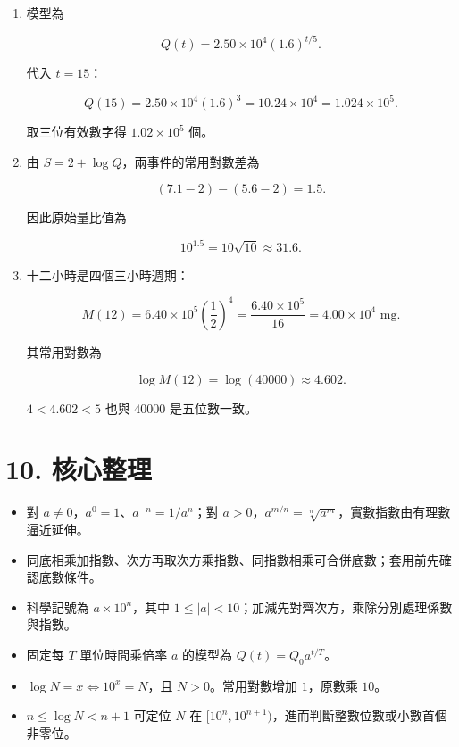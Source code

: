 \documentclass[11pt,a4paper]{article}
\providecommand{\tightlist}{%
  \setlength{\itemsep}{0pt}\setlength{\parskip}{0pt}}
\begin{document}
\begin{enumerate}
  \[
  2^{120}=10^{120\log2}\approx10^{36.1236}
  =10^{0.1236}\times10^{36}.
  \]

  因 \(36<36.1236<37\)，所以有 \(\boxed{37}\) 位。計算機給出 \(10^{0.1236}\approx1.3297\)，三位有效數字為

  \[
  \boxed{1.33\times10^{36}}.
  \]
\item
  模型為

  \[
  Q(t)=2.50\times10^4(1.6)^{t/5}.
  \]

  代入 \(t=15\)：

  \[
  Q(15)=2.50\times10^4(1.6)^3
  =10.24\times10^4
  =1.024\times10^5.
  \]

  取三位有效數字得 \(\boxed{1.02\times10^5}\) 個。
\item
  由 \(S=2+\log Q\)，兩事件的常用對數差為

  \[
  (7.1-2)-(5.6-2)=1.5.
  \]

  因此原始量比值為

  \[
  10^{1.5}=10\sqrt{10}\approx\boxed{31.6}.
  \]
\item
  十二小時是四個三小時週期：

  \[
  M(12)=6.40\times10^5\left(\frac12\right)^4
  =\frac{6.40\times10^5}{16}
  =\boxed{4.00\times10^4\text{ mg}}.
  \]

  其常用對數為

  \[
  \log M(12)=\log(40000)\approx\boxed{4.602}.
  \]

  \(4<4.602<5\) 也與 \(40000\) 是五位數一致。
\end{enumerate}

\section{10. 核心整理}\label{ux6838ux5fc3ux6574ux7406}

\begin{itemize}
\tightlist
\item
  對 \(a\ne0\)，\(a^0=1\)、\(a^{-n}=1/a^n\)；對 \(a>0\)，\(a^{m/n}=\sqrt[n]{a^m}\)，實數指數由有理數逼近延伸。
\item
  同底相乘加指數、次方再取次方乘指數、同指數相乘可合併底數；套用前先確認底數條件。
\item
  科學記號為 \(a\times10^n\)，其中 \(1\le|a|<10\)；加減先對齊次方，乘除分別處理係數與指數。
\item
  固定每 \(T\) 單位時間乘倍率 \(a\) 的模型為 \(Q(t)=Q_0a^{t/T}\)。
\item
  \(\log N=x\iff10^x=N\)，且 \(N>0\)。常用對數增加 \(1\)，原數乘 \(10\)。
\item
  \(n\le\log N<n+1\) 可定位 \(N\) 在 \([10^n,10^{n+1})\)，進而判斷整數位數或小數首個非零位。
\end{itemize}
\end{document}
